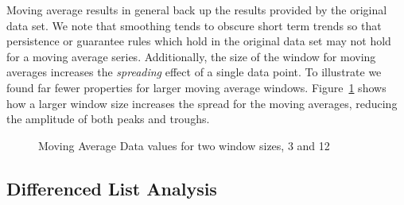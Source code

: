\smallskip

Moving average results in general back up the results provided by the
original data set. We note that smoothing tends to obscure short
term trends so that persistence or guarantee rules which hold in the
original data set may not hold for a moving average
series. Additionally, the size of the window for moving 
averages increases the {\em spreading} effect of a single data
point. To illustrate we found far fewer properties for larger moving
average windows. Figure~\ref{graph:ma3_12} shows how a larger window
size increases the spread for the moving averages, reducing the
amplitude of both peaks and troughs.


\begin{figure}
\centerline{}
\caption{\label{graph:ma3_12}{Moving Average Data
values for two window sizes, 3 and 12}}
\end{figure}


\subsection{Differenced List Analysis}\label{subsec:tr__diff_analysis}

